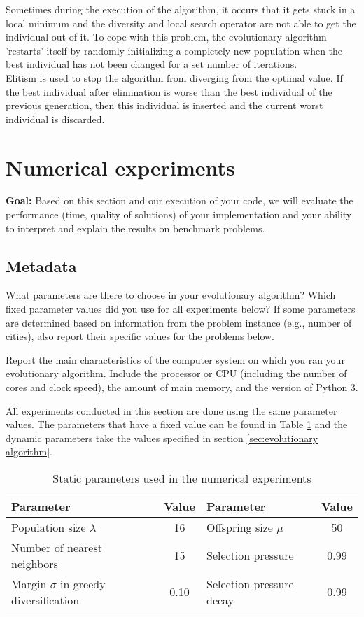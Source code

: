 \documentclass[a4paper,10pt]{article}
\newcommand{\ReplaceMe}[1]{{\color{blue}#1}}
\newcommand{\RemoveMe}[1]{{\color{purple}#1}}
\begin{document}
Sometimes during the execution of the algorithm, it occurs that it gets stuck in a local minimum and the diversity and local search operator are not able to get the individual out of it. To cope with this problem, the evolutionary algorithm 'restarts' itself by randomly initializing a completely new population when the best individual has not been changed for a set number of iterations. \\

Elitism is used to stop the algorithm from diverging from the optimal value. If the best individual after elimination is worse than the best individual of the previous generation, then this individual is inserted and the current worst individual is discarded. 


\section{Numerical experiments}

\RemoveMe{\textbf{Goal:} Based on this section and our execution of your code, we will evaluate the performance (time, quality of solutions) of your implementation and your ability to interpret and explain the results on benchmark problems.}

\subsection{Metadata}

\ReplaceMe{What parameters are there to choose in your evolutionary algorithm? Which fixed parameter values did you use for all experiments below? If some parameters are determined based on information from the problem instance (e.g., number of cities), also report their specific values for the problems below.

Report the main characteristics of the computer system on which you ran your evolutionary algorithm. Include the processor or CPU (including the number of cores and clock speed), the amount of main memory, and the version of Python 3.}

All experiments conducted in this section are done using the same parameter values. The parameters that have a fixed value can be found in Table \ref{table:experiments} and the dynamic parameters take the values specified in section \ref{sec:evolutionary algorithm}.

\begin{table}
\begin{center}
\caption{Static parameters used in the numerical experiments}
\label{table:experiments}
\begin{tabular}{|l|c||l|c|}\hline
\rowcolor[HTML]{C0C0C0}
Parameter	& Value		& Parameter	& Value \\ \hline
Population size $\lambda$	&16 	&Offspring size $\mu$	&50 \\
Number of nearest neighbors	& 15	& Selection pressure	& 0.99 \\
Margin $\sigma$ in greedy diversification	&0.10	&Selection pressure decay	&0.99 \\
\hline
\end{tabular}
\end{center}
\end{table}
\end{document}
